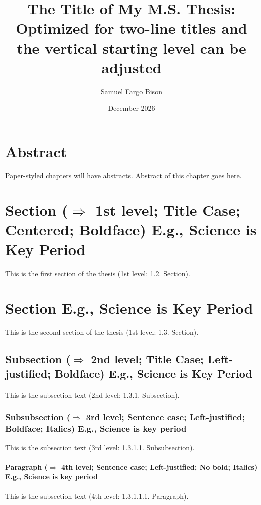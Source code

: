 \documentclass[ms-thesis,mathdesign,12pt,showgrid]{ndsu-thesis-2022}
\title{The Title of My M.S. Thesis: Optimized for two-line titles and the vertical starting level can be adjusted}
\author{Samuel Fargo Bison}
\date{December 2026}
\begin{document}

\section{Abstract}
Paper-styled chapters will have abstracts. Abstract of this chapter goes here. \kant[1]

\section{Section ($\Rightarrow$ 1st level; Title Case; Centered; Boldface) E.g., Science is Key Period}
This is the first section of the thesis (1st level: 1.2. Section). \kant[2]

\section{Section E.g., Science is Key Period}
This is the second section of the thesis (1st level: 1.3. Section). \kant[3]

\subsection{Subsection ($\Rightarrow$ 2nd level; Title Case; Left-justified; Boldface) E.g., Science is Key Period}
This is the subsection text (2nd level: 1.3.1. Subsection). \kant[4]

\subsubsection{Subsubsection ($\Rightarrow$ 3rd level; Sentence case; Left-justified; Boldface; Italics) E.g., Science is key period}
This is the subsection text (3rd level: 1.3.1.1. Subsubsection). \kant[5]

\paragraph{Paragraph ($\Rightarrow$ 4th level; Sentence case; Left-justified; No bold; Italics)  E.g., Science is key period}
This is the subsection text (4th level: 1.3.1.1.1. Paragraph). \kant[6]
\end{document}
